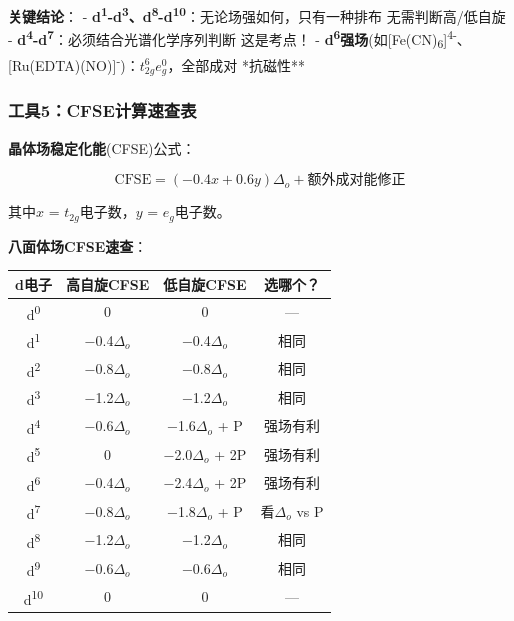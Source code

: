 \textbf{关键结论}：
- \textbf{d\textsuperscript{1}-d\textsuperscript{3}、d\textsuperscript{8}-d\textsuperscript{10}}：无论场强如何，只有一种排布 \箭 无需判断高/低自旋
- \textbf{d\textsuperscript{4}-d\textsuperscript{7}}：必须结合光谱化学序列判断 \箭 这是考点！
- \textbf{d\textsuperscript{6}强场}(如{[}Fe(CN)\textsubscript{6}{]}\textsuperscript{4-}、{[}Ru(EDTA)(NO){]}\textsuperscript{-})：\(t_{2g}^{6}e_{g}^{0}\)，全部成对 \箭 **抗磁性**

\subsubsection{工具5：CFSE计算速查表}\label{ux5de5ux51775cfseux8ba1ux7b97ux901fux67e5ux8868}

\textbf{晶体场稳定化能}(CFSE)公式：

\[\text{CFSE} = (-0.4x + 0.6y) \Delta_o + \text{额外成对能修正}\]

其中\(x\) = \(t_{2g}\)电子数，\(y\) = \(e_g\)电子数。

\textbf{八面体场CFSE速查}：

{\def\LTcaptype{none} %
\begin{longtable}[]{@{}cccc@{}}
\toprule\noalign{}
d电子 & 高自旋CFSE & 低自旋CFSE & 选哪个？ \\
\midrule\noalign{}
\endhead
\bottomrule\noalign{}
\endlastfoot
d\textsuperscript{0} & 0 & 0 & --- \\
d\textsuperscript{1} & −0.4\(\Delta_o\) & −0.4\(\Delta_o\) & 相同 \\
d\textsuperscript{2} & −0.8\(\Delta_o\) & −0.8\(\Delta_o\) & 相同 \\
d\textsuperscript{3} & −1.2\(\Delta_o\) & −1.2\(\Delta_o\) & 相同 \\
d\textsuperscript{4} & −0.6\(\Delta_o\) & −1.6\(\Delta_o\) + P & 强场有利 \\
d\textsuperscript{5} & 0 & −2.0\(\Delta_o\) + 2P & 强场有利 \\
d\textsuperscript{6} & −0.4\(\Delta_o\) & −2.4\(\Delta_o\) + 2P & 强场有利 \\
d\textsuperscript{7} & −0.8\(\Delta_o\) & −1.8\(\Delta_o\) + P & 看\(\Delta_o\) vs P \\
d\textsuperscript{8} & −1.2\(\Delta_o\) & −1.2\(\Delta_o\) & 相同 \\
d\textsuperscript{9} & −0.6\(\Delta_o\) & −0.6\(\Delta_o\) & 相同 \\
d\textsuperscript{10} & 0 & 0 & --- \\
\end{longtable}
}

